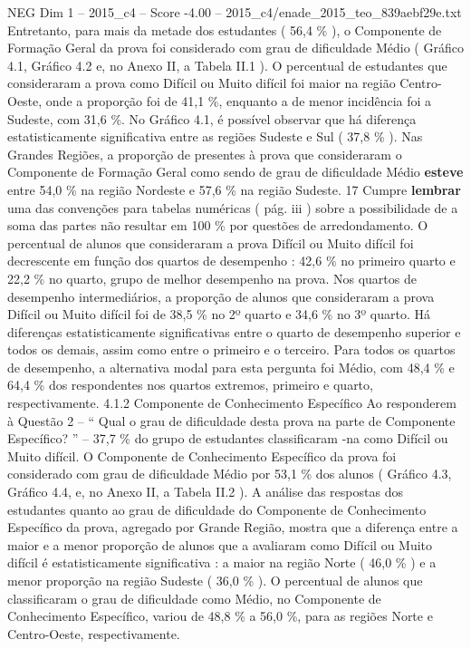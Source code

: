 \begin{textsample}{NEG Dim 1 – 2015\_c4 – Score -4.00 – 2015\_c4/enade\_2015\_teo\_839aebf29e.txt}
Entretanto, para mais da metade dos estudantes ( 56,4 \% ), o Componente de Formação Geral da prova foi considerado com grau de dificuldade Médio ( Gráfico 4.1, Gráfico 4.2 e, no Anexo II, a Tabela II.1 ).
O percentual de estudantes que consideraram a prova como Difícil ou Muito difícil foi maior na região Centro-Oeste, onde a proporção foi de 41,1 \%, enquanto a de menor incidência foi a Sudeste, com 31,6 \%.
No Gráfico 4.1, é possível observar que há diferença estatisticamente significativa entre as regiões Sudeste e Sul ( 37,8 \% ).
Nas Grandes Regiões, a proporção de presentes à prova que consideraram o Componente de Formação Geral como sendo de grau de dificuldade Médio \textbf{esteve} entre 54,0 \% na região Nordeste e 57,6 \% na região Sudeste. 17 Cumpre \textbf{lembrar} uma das convenções para tabelas numéricas ( pág. iii ) sobre a possibilidade de a soma das partes não resultar em 100 \% por questões de arredondamento.
O percentual de alunos que consideraram a prova Difícil ou Muito difícil foi decrescente em função dos quartos de desempenho : 42,6 \% no primeiro quarto e 22,2 \% no quarto, grupo de melhor desempenho na prova.
Nos quartos de desempenho intermediários, a proporção de alunos que consideraram a prova Difícil ou Muito difícil foi de 38,5 \% no 2º quarto e 34,6 \% no 3º quarto.
Há diferenças estatisticamente significativas entre o quarto de desempenho superior e todos os demais, assim como entre o primeiro e o terceiro.
Para todos os quartos de desempenho, a alternativa modal para esta pergunta foi Médio, com 48,4 \% e 64,4 \% dos respondentes nos quartos extremos, primeiro e quarto, respectivamente. 4.1.2 Componente de Conhecimento Específico Ao responderem à Questão 2 – “ Qual o grau de dificuldade desta prova na parte de Componente Específico? ” – 37,7 \% do grupo de estudantes classificaram -na como Difícil ou Muito difícil.
O Componente de Conhecimento Específico da prova foi considerado com grau de dificuldade Médio por 53,1 \% dos alunos ( Gráfico 4.3, Gráfico 4.4, e, no Anexo II, a Tabela II.2 ).
A análise das respostas dos estudantes quanto ao grau de dificuldade do Componente de Conhecimento Específico da prova, agregado por Grande Região, mostra que a diferença entre a maior e a menor proporção de alunos que a avaliaram como Difícil ou Muito difícil é estatisticamente significativa : a maior na região Norte ( 46,0 \% ) e a menor proporção na região Sudeste ( 36,0 \% ).
O percentual de alunos que classificaram o grau de dificuldade como Médio, no Componente de Conhecimento Específico, variou de 48,8 \% a 56,0 \%, para as regiões Norte e Centro-Oeste, respectivamente.

\end{textsample}
